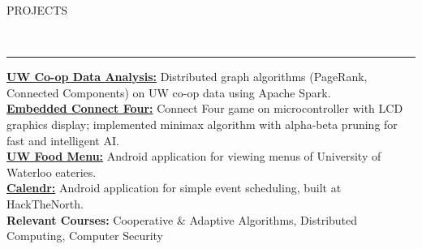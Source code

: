 \documentclass[11pt, letterpaper, oneside]{article}
\newcommand{\HRule}[2]{\textcolor{#1}{\rule{\linewidth}{#2}}}
\newcommand{\sectiontitle}[1]{\begin{minipage}{\textwidth}\vspace{-7.5pt}\begin{flushleft}\hspace{-20.5pt}\vspace{-25pt}
\Large\MakeUppercase{#1}\end{flushleft}\end{minipage}\\\HRule{black}{0.15mm}\vspace{\baselineskip}}
\newenvironment{ressection}[1]{
  \sectiontitle{#1}}
  {\vspace{-\baselineskip}}
\begin{document}
\begin{ressection}{Projects}\vspace{-12pt}
  \href{https://github.com/coreywu/CoopStatsDataAnalysis}{\textbf{UW Co-op Data Analysis:}} Distributed graph algorithms (PageRank, Connected Components) on UW co-op data using Apache Spark. \vspace{4pt} \\
  \href{https://github.com/coreywu/Connect4}{\textbf{Embedded Connect Four:}} Connect Four game on microcontroller with LCD graphics display; implemented minimax algorithm with alpha-beta pruning for fast and intelligent AI.\vspace{4pt} \\
  \href{https://play.google.com/store/apps/details?id=ca.uwaterloo.uwfoodservices&hl=en}{\textbf{UW Food Menu:}} Android application for viewing menus of University of Waterloo eateries.\vspace{4pt} \\
   \href{http://devpost.com/software/calendr-wq4uf}{\textbf{Calendr:}} Android application for simple event scheduling, built at HackTheNorth.
  \vspace{8pt}\\\hspace{-20pt} \textbf{Relevant Courses:} Cooperative \& Adaptive Algorithms, Distributed Computing, Computer Security
\end{ressection}
\end{document}
